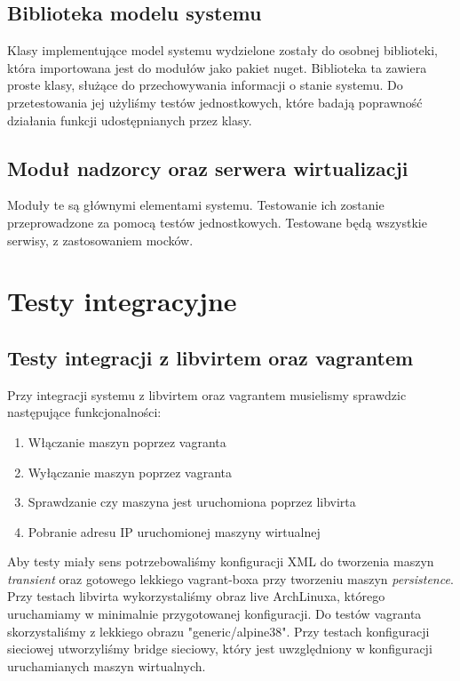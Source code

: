 \documentclass[12pt]{article}
\begin{document}
\subsection{Biblioteka modelu systemu}

Klasy implementujące model systemu wydzielone zostały do osobnej biblioteki, która importowana jest do modułów jako pakiet nuget. Biblioteka ta zawiera proste klasy, służące do przechowywania informacji o stanie systemu. Do przetestowania jej użyliśmy testów jednostkowych, które badają poprawność działania funkcji udostępnianych przez klasy.

\subsection{Moduł nadzorcy oraz serwera wirtualizacji}

Moduły te są głównymi elementami systemu. Testowanie ich zostanie przeprowadzone za pomocą testów jednostkowych. Testowane będą wszystkie serwisy, z zastosowaniem mocków.

\section{Testy integracyjne}

\subsection {Testy integracji z libvirtem oraz vagrantem}

Przy integracji systemu z libvirtem oraz vagrantem musielismy sprawdzic następujące funkcjonalności:
\begin{enumerate}
	\item Włączanie maszyn poprzez vagranta
	\item Wyłączanie maszyn poprzez vagranta
	\item Sprawdzanie czy maszyna jest uruchomiona poprzez libvirta
	\item Pobranie adresu IP uruchomionej maszyny wirtualnej
\end{enumerate}

Aby testy miały sens potrzebowaliśmy konfiguracji XML do tworzenia maszyn \textit{transient} oraz gotowego lekkiego vagrant-boxa przy tworzeniu maszyn \textit{persistence}.
Przy testach libvirta wykorzystaliśmy obraz live ArchLinuxa, którego uruchamiamy w minimalnie przygotowanej konfiguracji.
Do testów vagranta skorzystaliśmy z lekkiego obrazu "generic/alpine38".
Przy testach konfiguracji sieciowej utworzyliśmy bridge sieciowy, który jest uwzględniony w konfiguracji uruchamianych maszyn wirtualnych.
\end{document}
